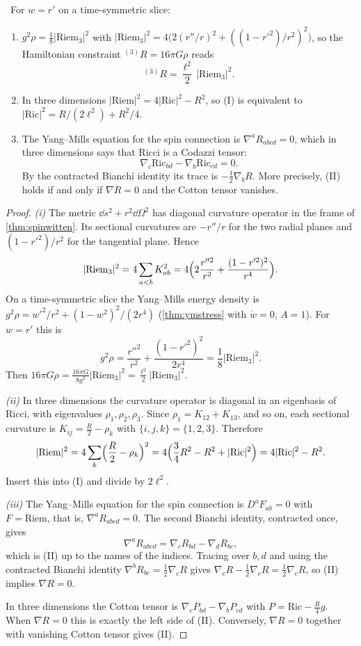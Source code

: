 \begin{theorem}\label{thm:geomconstraint}\ver\
For $w=r'$ on a time-symmetric slice:
\begin{enumerate}[label=(\roman*)]
\item $g^2\rho=\frac18|\mathrm{Riem}_3|^2$ with $|\mathrm{Riem}_3|^2=4\bigl(2(r''/r)^2+((1-r'^2)/r^2)^2\bigr)$, so the Hamiltonian constraint ${}^{(3)}R=16\pi G\rho$ reads
\[
{}^{(3)}R=\frac{\ell^2}{2}\,|\mathrm{Riem}_3|^2. \tag{I}
\]
\item In three dimensions $|\mathrm{Riem}|^2=4|\mathrm{Ric}|^2-R^2$, so (I) is equivalent to $|\mathrm{Ric}|^2=R/(2\ell^2)+R^2/4$.
\item The Yang--Mills equation for the spin connection is $\nabla^aR_{abcd}=0$, which in three dimensions says that Ricci is a Codazzi tensor:
\[
\nabla_c\mathrm{Ric}_{bd}-\nabla_b\mathrm{Ric}_{cd}=0. \tag{II}
\]
By the contracted Bianchi identity its trace is $-\frac12\nabla_bR$. More precisely, (II) holds if and only if $\nabla R=0$ and the Cotton tensor vanishes.
\end{enumerate}
\end{theorem}
\begin{proof}
\emph{(i)} The metric $\dd s^2+r^2\dd\Omega^2$ has diagonal curvature operator in the frame of \cref{thm:spinwitten}. Its sectional curvatures are $-r''/r$ for the two radial planes and $(1-r'^2)/r^2$ for the tangential plane. Hence
\[
|\mathrm{Riem}_3|^2=4\sum_{a<b}K_{ab}^2=4\Bigl(2\frac{r''^2}{r^2}+\frac{(1-r'^2)^2}{r^4}\Bigr).
\]
On a time-symmetric slice the Yang--Mills energy density is $g^2\rho=w'^2/r^2+(1-w^2)^2/(2r^4)$ (\cref{thm:ymstress} with $\dot w=0$, $A=1$). For $w=r'$ this is
\[
g^2\rho=\frac{r''^2}{r^2}+\frac{(1-r'^2)^2}{2r^4}=\frac18|\mathrm{Riem}_3|^2 .
\]
Then $16\pi G\rho=\frac{16\pi G}{8g^2}|\mathrm{Riem}_3|^2=\frac{\ell^2}2|\mathrm{Riem}_3|^2$.

\emph{(ii)} In three dimensions the curvature operator is diagonal in an eigenbasis of Ricci, with eigenvalues $\rho_1,\rho_2,\rho_3$. Since $\rho_1=K_{12}+K_{13}$, and so on, each sectional curvature is $K_{ij}=\frac R2-\rho_k$ with $\{i,j,k\}=\{1,2,3\}$. Therefore
\[
|\mathrm{Riem}|^2=4\sum_k\Bigl(\frac R2-\rho_k\Bigr)^2=4\Bigl(\frac34R^2-R^2+|\mathrm{Ric}|^2\Bigr)=4|\mathrm{Ric}|^2-R^2 .
\]
Insert this into (I) and divide by $2\ell^2$.

\emph{(iii)} The Yang--Mills equation for the spin connection is $D^aF_{ab}=0$ with $F=\mathrm{Riem}$, that is, $\nabla^aR_{abcd}=0$. The second Bianchi identity, contracted once, gives
\[
\nabla^aR_{abcd}=\nabla_cR_{bd}-\nabla_dR_{bc} ,
\]
which is (II) up to the names of the indices. Tracing over $b,d$ and using the contracted Bianchi identity $\nabla^bR_{bc}=\frac12\nabla_cR$ gives $\nabla_cR-\frac12\nabla_cR=\frac12\nabla_cR$, so (II) implies $\nabla R=0$.

In three dimensions the Cotton tensor is $\nabla_cP_{bd}-\nabla_bP_{cd}$ with $P=\mathrm{Ric}-\frac R4g$. When $\nabla R=0$ this is exactly the left side of (II). Conversely, $\nabla R=0$ together with vanishing Cotton tensor gives (II).
\end{proof}



